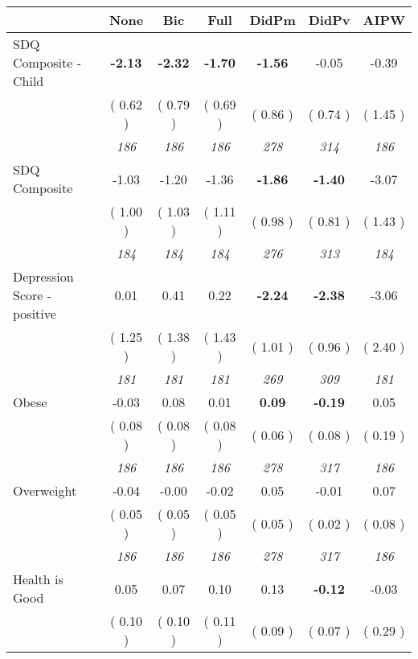 \begin{tabular}{l c c c c c c}
\toprule
 & None & Bic & Full & DidPm & DidPv & AIPW \\
\midrule
SDQ Composite - Child & \textbf{     -2.13 } & \textbf{     -2.32 } & \textbf{     -1.70 } & \textbf{     -1.56 } &     -0.05 &     -0.39 \\
& (     0.62 ) & (     0.79 ) & (     0.69 ) & (     0.86 ) & (     0.74 ) & (     1.45 ) \\
& \textit{ 186 } & \textit{ 186 } & \textit{ 186 } & \textit{ 278 } & \textit{ 314 } & \textit{ 186 } \\
SDQ Composite &     -1.03 &     -1.20 &     -1.36 & \textbf{     -1.86 } & \textbf{     -1.40 } &     -3.07 \\
& (     1.00 ) & (     1.03 ) & (     1.11 ) & (     0.98 ) & (     0.81 ) & (     1.43 ) \\
& \textit{ 184 } & \textit{ 184 } & \textit{ 184 } & \textit{ 276 } & \textit{ 313 } & \textit{ 184 } \\
Depression Score - positive &      0.01 &      0.41 &      0.22 & \textbf{     -2.24 } & \textbf{     -2.38 } &     -3.06 \\
& (     1.25 ) & (     1.38 ) & (     1.43 ) & (     1.01 ) & (     0.96 ) & (     2.40 ) \\
& \textit{ 181 } & \textit{ 181 } & \textit{ 181 } & \textit{ 269 } & \textit{ 309 } & \textit{ 181 } \\
Obese &     -0.03 &      0.08 &      0.01 & \textbf{      0.09 } & \textbf{     -0.19 } &      0.05 \\
& (     0.08 ) & (     0.08 ) & (     0.08 ) & (     0.06 ) & (     0.08 ) & (     0.19 ) \\
& \textit{ 186 } & \textit{ 186 } & \textit{ 186 } & \textit{ 278 } & \textit{ 317 } & \textit{ 186 } \\
Overweight &     -0.04 &     -0.00 &     -0.02 &      0.05 &     -0.01 &      0.07 \\
& (     0.05 ) & (     0.05 ) & (     0.05 ) & (     0.05 ) & (     0.02 ) & (     0.08 ) \\
& \textit{ 186 } & \textit{ 186 } & \textit{ 186 } & \textit{ 278 } & \textit{ 317 } & \textit{ 186 } \\
Health is Good &      0.05 &      0.07 &      0.10 &      0.13 & \textbf{     -0.12 } &     -0.03 \\
& (     0.10 ) & (     0.10 ) & (     0.11 ) & (     0.09 ) & (     0.07 ) & (     0.29 ) \\

\end{tabular}
